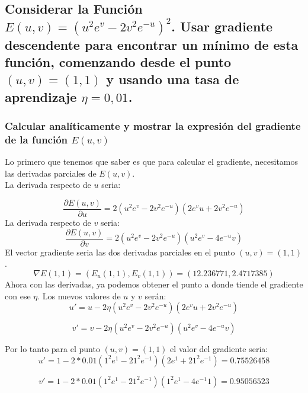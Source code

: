 \documentclass[12pt,a4paper]{article}
\begin{document}
\subsection{Considerar la Función \(  E(u, v) = (u^2e^v - 2v^2e^{-u})^2\). Usar gradiente descendente para encontrar un mínimo de esta función, comenzando desde el punto \((u, v) = (1, 1)\) y usando una tasa de aprendizaje \(\eta = 0,01\).}
\subsubsection{Calcular analíticamente y mostrar la expresión del gradiente de la función \(E(u, v)\)}
Lo primero que tenemos que saber es que para calcular el gradiente, necesitamos las derivadas parciales de \(E(u,v)\). \\
La derivada respecto de \(u\) seria: 

\begin{equation}
\frac{\partial E(u,v)}
{\partial u} = 2\left(u^2e^v-2v^2e^{-u}\right)\left(2e^vu+2v^2e^{-u}\right)
\end{equation}
La derivada respecto de \(v\) seria: 
\begin{equation}
\frac{\partial E(u,v)}
{\partial v} = 2\left(u^2e^v-2v^2e^{-u}\right)\left(u^2e^v-4e^{-u}v\right)
\end{equation}
El vector gradiente seria las dos derivadas parciales en el punto  $(u, v) = (1, 1)$.
\begin{equation}
\nabla E(1,1) = (E_u(1,1),E_v(1,1)) = (12.236771,2.4717385)
\end{equation}
Ahora con las derivadas, ya podemos obtener el punto a donde tiende el gradiente con ese $\eta$. Los nuevos valores de \(u\) y \(v\) serán:
\begin{equation}
u' = u - 2\eta\left(u^2e^v-2v^2e^{-u}\right)\left(2e^vu+2v^2e^{-u}\right)
\end{equation}

\begin{equation}
v' = v - 2\eta\left(u^2e^v-2v^2e^{-u}\right)\left(u^2e^v-4e^{-u}v\right)
\end{equation}

Por lo tanto para el punto $(u, v) = (1, 1)$ el valor del gradiente seria:
\begin{equation}
u' = 1 - 2*0.01\left(1^2e^1-21^2e^{-1}\right)\left(2e^1+21^2e^{-1}\right) = 0.75526458
\end{equation}

\begin{equation}
v' = 1 - 2*0.01\left(1^2e^1-21^2e^{-1}\right)\left(1^2e^1-4e^{-1}1\right) = 0.95056523
\end{equation}
\end{document}
